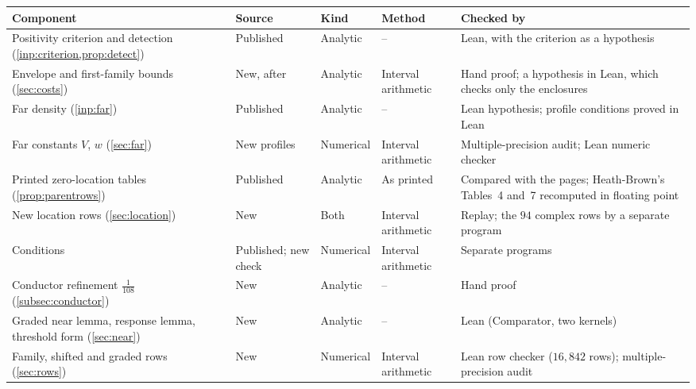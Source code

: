 \begin{table}[tp]
\centering
\footnotesize
\setlength{\tabcolsep}{4pt}
\begin{tabular}{@{}>{\raggedright\arraybackslash}p{}
                >{\raggedright\arraybackslash}p{}
                >{\raggedright\arraybackslash}p{}
                >{\raggedright\arraybackslash}p{}
                >{\raggedright\arraybackslash}p{}@{}}
\toprule
Component & Source & Kind & Method & Checked by\\
\midrule
Positivity criterion and detection (\cref{inp:criterion,prop:detect}) &
  Published \cite{Xylouris2011nullstellen} & Analytic & -- &
  Lean, with the criterion as a hypothesis\\
Envelope and first-family bounds (\cref{sec:costs}) &
  New, after \cite{Xylouris2011nullstellen} & Analytic & Interval arithmetic &
  Hand proof; a hypothesis in Lean, which checks only the enclosures\\
Far density (\cref{inp:far}) &
  Published \cite{Xylouris2011nullstellen} & Analytic & -- &
  Lean hypothesis; profile conditions proved in Lean\\
Far constants $V$, $w$ (\cref{sec:far}) &
  New profiles & Numerical & Interval arithmetic &
  Multiple-precision audit; Lean numeric checker\\
Printed zero-location tables (\cref{prop:parentrows}) &
  Published \cite{HeathBrown1992zero,Xylouris2011nullstellen} & Analytic & As printed &
  Compared with the pages; Heath-Brown's Tables~4 and~7 recomputed in floating point\\
New location rows (\cref{sec:location}) &
  New & Both & Interval arithmetic &
  Replay; the $94$ complex rows by a separate program\\
Conditions \cite[(4.29), (4.34)]{Xylouris2011nullstellen} &
  Published; new check & Numerical & Interval arithmetic &
  Separate programs\\
Conductor refinement $\frac1{108}$ (\cref{subsec:conductor}) &
  New & Analytic & -- & Hand proof\\
Graded near lemma, response lemma, threshold form (\cref{sec:near}) &
  New & Analytic & -- & Lean (Comparator, two kernels)\\
Family, shifted and graded rows (\cref{sec:rows}) &
  New & Numerical & Interval arithmetic &
  Lean row checker ($16{,}842$ rows); multiple-precision audit\\

\end{tabular}
\end{table}
